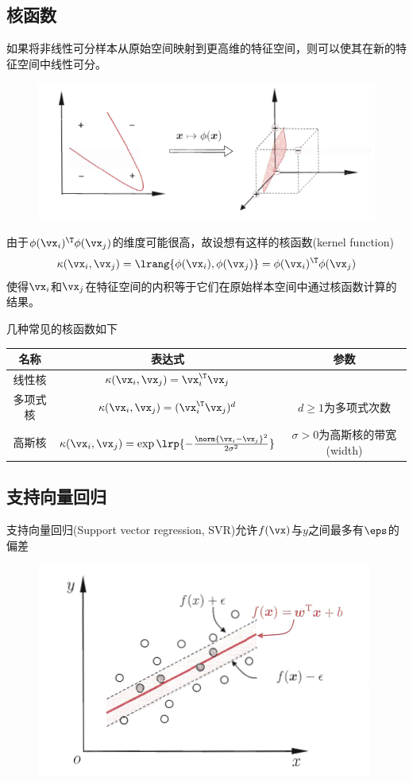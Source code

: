 \subsection{核函数}
如果将非线性可分样本从原始空间映射到更高维的特征空间，则可以使其在新的特征空间中线性可分。
\begin{figure}[H]
\centering
\includegraphics[width=0.6\linewidth]{fig/xor-nonlinear.png}
\end{figure}

由于$\phi(\vx_i)^\T\phi(\vx_j)$的维度可能很高，故设想有这样的核函数(kernel function)
\[\kappa(\vx_i,\vx_j)=\lrang{\phi(\vx_i),\phi(\vx_j)}=\phi(\vx_i)^\T\phi(\vx_j)\]
使得$\vx_i$和$\vx_j$在特征空间的内积等于它们在原始样本空间中通过核函数计算的结果。

几种常见的核函数如下
\begin{center}
\begin{tabular}{ccc}\hline
名称 & 表达式 & 参数\\\hline
线性核 & $\kappa(\vx_i,\vx_j)=\vx_i^\T\vx_j$ & \\
多项式核 & $\kappa(\vx_i,\vx_j)=(\vx_i^\T\vx_j)^d$ & $d\geq 1$为多项式次数\\
高斯核 & $\kappa(\vx_i,\vx_j)=\exp\lrp{-\frac{\norm{\vx_i-\vx_j}^2}{2\sigma^2}}$ & $\sigma>0$为高斯核的带宽(width)\\\hline
\end{tabular}
\end{center}

\subsection{支持向量回归}
支持向量回归(Support vector regression, SVR)允许$f(\vx)$与$y$之间最多有$\eps$的偏差
\begin{figure}[H]
\centering
\includegraphics[width=0.6\linewidth]{fig/SVR.png}
\end{figure}

